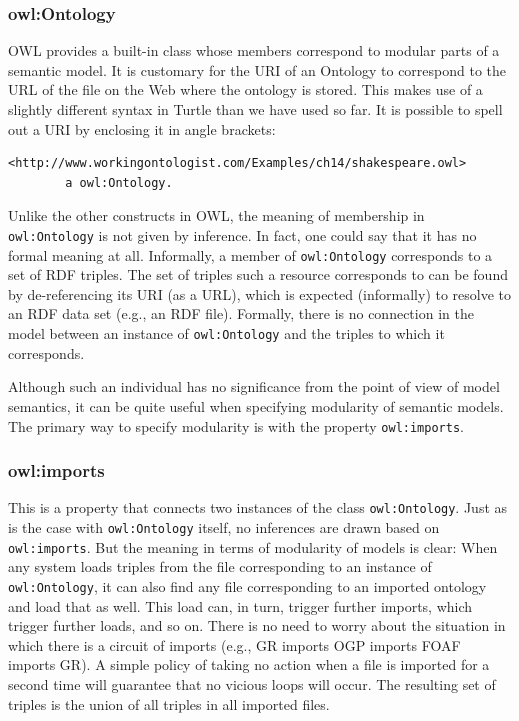\subsubsection{owl:Ontology}

OWL provides a built-in class whose members correspond to modular parts
of a semantic model. It is customary for the URI of an Ontology to
correspond to the URL of the file on the Web where the ontology is
stored. This makes use of a slightly different syntax in Turtle than we
have used so far. It is possible to spell out a URI by enclosing it in
angle brackets:

\begin{lstlisting}
<http://www.workingontologist.com/Examples/ch14/shakespeare.owl>
        a owl:Ontology.
\end{lstlisting}

Unlike the other constructs in OWL, the meaning of membership in
\texttt{owl:Ontology} is not given by inference. In fact, one could say that it
has no formal meaning at all. Informally, a member of \texttt{owl:Ontology}
corresponds to a set of RDF triples. The set of triples such a resource
corresponds to can be found by de-referencing its URI (as a URL), which
is expected (informally) to resolve to an RDF data set (e.g., an RDF
file). Formally, there is no connection in the model between an instance
of \texttt{owl:Ontology} and the triples to which it corresponds.

Although such an individual has no significance from the point of view
of model semantics, it can
be quite useful when specifying modularity of semantic models. The
primary way to specify modularity is with the property \texttt{owl:imports}.

\subsubsection{owl:imports}

This is a property that connects two instances of the class
\texttt{owl:Ontology}. Just as is the case with \texttt{owl:Ontology} itself, no
inferences are drawn based on \texttt{owl:imports}. But the meaning in terms of
modularity of models is clear: When any system loads triples from the
file corresponding to an instance of \texttt{owl:Ontology}, it can also find any
file corresponding to an imported ontology and load that as well. This
load can, in turn, trigger further imports, which trigger further loads,
and so on. There is no need to worry about the situation in which there
is a circuit of imports (e.g., GR imports OGP imports FOAF imports GR).
A simple policy of taking no action when a file is imported for a second
time will guarantee that no vicious loops will occur. The resulting set
of triples is the union of all triples in all imported files.

